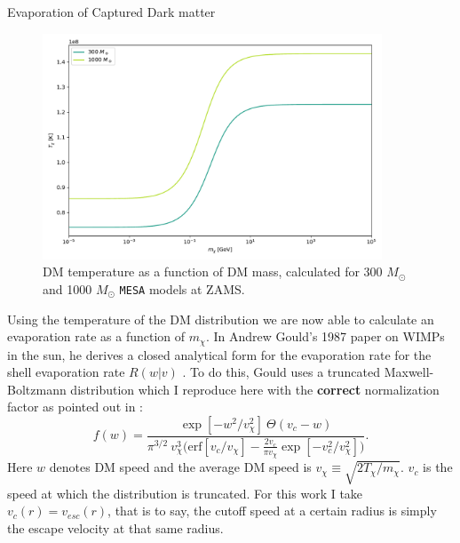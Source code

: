 \documentclass[a4paper,11pt]{article}
\begin{document}
\begin{section}{Evaporation of Captured Dark matter}
    \begin{figure}
        \centering
        \includegraphics[width=0.9\textwidth]{Tchi.pdf}
        \caption{DM temperature as a function of DM mass, calculated for 300 $M_\odot$ and 1000 $M_\odot$ \texttt{MESA} models at ZAMS.}
    \end{figure}

    Using the temperature of the DM distribution we are now able to calculate an evaporation rate as a function of $m_\chi$.
    In Andrew Gould's 1987 paper on WIMPs in the sun, he derives a closed analytical form for the evaporation rate for the shell evaporation rate $R(w|v)$ \cite{Gould:1987}. 
    To do this, Gould uses a truncated Maxwell-Boltzmann distribution which I reproduce here with the \textbf{correct} normalization factor as pointed out in \cite{Ilie:2020popiii}:
    \begin{equation}
        f(w) = \frac{\exp[-w^2 / v_\chi^2] ~ \Theta(v_c - w) }{\pi^{3/2} ~ v_\chi^3 \bigg(\text{erf}[v_c / v_\chi] - \frac{2 v_c}{\pi v_{\chi}} \exp[-v_c^2 / v_{\chi}^2 ] \bigg)}.
        \label{evapf}
    \end{equation}
    Here $w$ denotes DM speed and the average DM speed is $v_\chi \equiv \sqrt{2T_\chi/m_\chi}$.
    $v_c$ is the speed at which the distribution is truncated. For this work I take $v_c(r) = v_{esc}(r)$, that is to say, the cutoff speed at a certain radius is simply the escape velocity at that same radius.


\end{section}
\end{document}
